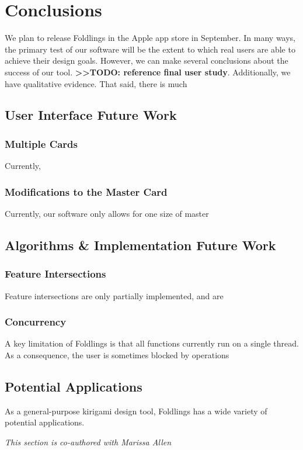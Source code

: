 \chapter{Conclusions}

We plan to release Foldlings in the Apple app store in September. In
many ways, the primary test of our software will be the extent to which
real users are able to achieve their design goals. However, we can make
several conclusions about the success of our tool.
\textbf{\textgreater{}\textgreater{}TODO: reference final user study}.
Additionally, we have qualitative evidence. That said, there is much

\section{User Interface Future Work}\label{user-interface-future-work}

\subsection{Multiple Cards}\label{multiple-cards}

Currently,

\citet{hart2007modular}

\subsection{Modifications to the Master
Card}\label{modifications-to-the-master-card}

Currently, our software only allows for one size of master

\section{Algorithms \& Implementation Future
Work}\label{algorithms-implementation-future-work}

\subsection{Feature Intersections}\label{feature-intersections}

Feature intersections are only partially implemented, and are

\subsection{Concurrency}\label{concurrency}

A key limitation of Foldlings is that all functions currently run on a
single thread. As a consequence, the user is sometimes blocked by
operations

\section{Potential Applications}\label{potential-applications}

As a general-purpose kirigami design tool, Foldlings has a wide variety
of potential applications.

\emph{This section is co-authored with Marissa Allen}
